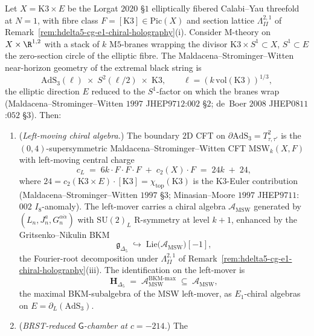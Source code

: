 \begin{proposition}
\label{prop:hochcalc-msw-kinematic-hdelta5-left-mover}
Let $X=\mathrm{K3}\times E$ be the Lorgat $2020$ \S$1$ elliptically
fibered Calabi--Yau threefold at $N=1$, with fibre class
$F=[\mathrm{K3}]\in\mathrm{Pic}(X)$ and section lattice
$\Lambda^{2,1}_{II}$ of
Remark~\ref{rem:hdelta5-cg-e1-chiral-holography}(i). Consider M-theory
on $X\times\R^{1,2}$ with a stack of $k$ M$5$-branes wrapping the
divisor $\mathrm{K3}\times S^1\subset X$, $S^1\subset E$ the
zero-section circle of the elliptic fibre. The
Maldacena--Strominger--Witten near-horizon geometry of the extremal
black string is
\[
 \mathrm{AdS}_3(\ell) \;\times\; S^2(\ell/2) \;\times\; \mathrm{K3},
 \qquad \ell = (k\,\mathrm{vol}(\mathrm{K3}))^{1/3},
\]
the elliptic direction $E$ reduced to the $S^1$-factor on which the
branes wrap (Maldacena--Strominger--Witten $1997$ JHEP$9712$:$002$
\S$2$; de~Boer $2008$ JHEP$0811$:$052$ \S$3$). Then:
\begin{enumerate}[label=(\roman*),leftmargin=1.5em]
 \item (\emph{Left-moving chiral algebra.}) The boundary $2$D CFT on
 $\partial\mathrm{AdS}_3=T^2_{\tau,\tau'}$ is the
 $(0,4)$-supersymmetric Maldacena--Strominger--Witten CFT
 $\mathrm{MSW}_k(X,F)$ with left-moving central charge
 \[
 c_L \;=\; 6k\cdot F{\cdot}F{\cdot}F \;+\; c_2(X){\cdot}F
 \;=\; 24k \;+\; 24,
 \]
 where $24=c_2(\mathrm{K3}\times E){\cdot}[\mathrm{K3}]=\chi_{\mathrm{top}}(\mathrm{K3})$
 is the K3-Euler contribution (Maldacena--Strominger--Witten $1997$
 \S$3$; Minasian--Moore $1997$ JHEP$9711$:$002$ $I_8$-anomaly). The
 left-mover carries a chiral algebra $\mathcal A_{\mathrm{MSW}}$
 generated by $(L_n, J_n^a, G_n^{\alpha\dot\alpha})$ with
 $\mathrm{SU}(2)_L$ R-symmetry at level $k+1$, enhanced by the
 Gritsenko--Nikulin BKM
 \[
 \mathfrak g_{\Delta_5} \;\hookrightarrow\;
 \mathrm{Lie}\bigl(\mathcal A_{\mathrm{MSW}}\bigr)[-1],
 \]
 the Fourier-root decomposition under $\Lambda^{2,1}_{II}$ of
 Remark~\ref{rem:hdelta5-cg-e1-chiral-holography}(iii). The
 identification on the left-mover is
 \[
 \mathbf H_{\Delta_5}
 \;=\; \mathcal A_{\mathrm{MSW}}^{\mathrm{BKM}\text{-}\mathrm{max}}
 \;\subseteq\; \mathcal A_{\mathrm{MSW}},
 \]
 the maximal BKM-subalgebra of the MSW left-mover, as $E_1$-chiral
 algebras on $E=\partial_L(\mathrm{AdS}_3)$.
 \item (\emph{BRST-reduced $\mathsf G$-chamber at $c=-214$.}) The

\end{enumerate}
\end{proposition}
